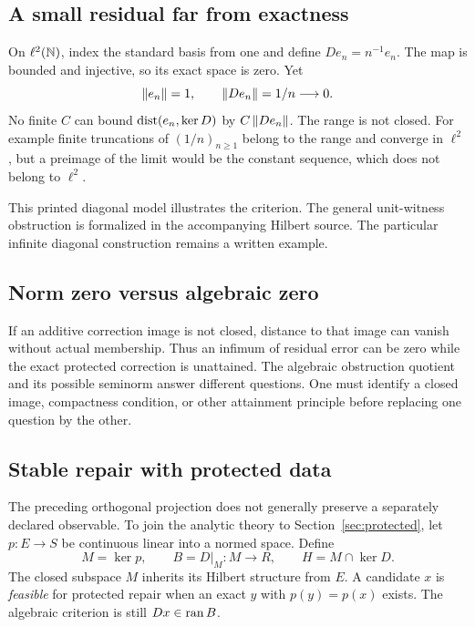 \subsection{A small residual far from exactness}
On \(\ell^2(\mathbb N)\), index the standard basis from one and define \(De_n=n^{-1}e_n\). The map is bounded and injective, so its exact space is zero. Yet
\[
 \left\lVert e_n\right\rVert=1,\qquad\left\lVert De_n\right\rVert=1/n\longrightarrow0.
\]
No finite \(C\) can bound \(\operatorname{dist}(e_n,\ker D)\) by \(C\left\lVert De_n\right\rVert\). The range is not closed. For example finite truncations of \((1/n)_{n\ge1}\) belong to the range and converge in \(\ell^2\), but a preimage of the limit would be the constant sequence, which does not belong to \(\ell^2\).

This printed diagonal model illustrates the criterion. The general unit-witness obstruction is formalized in the accompanying Hilbert source. The particular infinite diagonal construction remains a written example.


\subsection{Norm zero versus algebraic zero}
If an additive correction image is not closed, distance to that image can vanish without actual membership. Thus an infimum of residual error can be zero while the exact protected correction is unattained. The algebraic obstruction quotient and its possible seminorm answer different questions. One must identify a closed image, compactness condition, or other attainment principle before replacing one question by the other.

\subsection{Stable repair with protected data}
The preceding orthogonal projection does not generally preserve a separately declared observable. To join the analytic theory to Section~\ref{sec:protected}, let \(p:E\to S\) be continuous linear into a normed space. Define
\[
 M=\ker p,\qquad B=D|_M:M\to R,\qquad H=M\cap\ker D.
\]
The closed subspace \(M\) inherits its Hilbert structure from \(E\). A candidate \(x\) is \emph{feasible} for protected repair when an exact \(y\) with \(p(y)=p(x)\) exists. The algebraic criterion is still \(Dx\in\operatorname{ran} B\).

